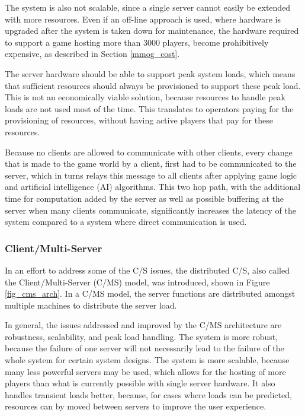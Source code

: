 The system is also not scalable, since a single server cannot easily be extended with more resources. Even if an off-line approach is used, where
hardware is upgraded after the system is taken down for maintenance, the hardware required to support a game hosting more than 3000 players, become
prohibitively expensive, as described in Section \ref{mmog_cost}.

The server hardware should be able to support peak system loads, which means that sufficient resources should always be provisioned to support these
peak load. This is not an economically viable solution, because resources to handle peak loads are not used most of the time. This translates to
operators paying for the provisioning of resources, without having active players that pay for these resources.

Because no clients are allowed to communicate with other clients, every change that is made to the game world by a client, first had to be
communicated to the server, which in turns relays this message to all clients after applying game logic and artificial intelligence (AI) algorithms.
This two hop path, with the additional time for computation added by the server as well as possible buffering at the server when many clients
communicate, significantly increases the latency of the system compared to a system where direct communication is used.

\subsubsection{Client/Multi-Server}

In an effort to address some of the C/S issues, the distributed C/S, also called the Client/Multi-Server (C/MS) model, was introduced, shown in Figure \ref{fig_cms_arch}. In a C/MS model,
the server functions are distributed amongst multiple machines to distribute the server load.

In general, the issues addressed and improved by the C/MS architecture are robustness, scalability, and peak load handling. The system is more robust, because the failure of one server will not necessarily lead to the failure of the whole system for certain system designs. The system is more scalable, because many less powerful servers may be used, which allows for the hosting of more players than what is currently possible with single server hardware. It also handles transient loads better, because, for cases where loads can be predicted, resources can by moved between servers to improve the user experience.

